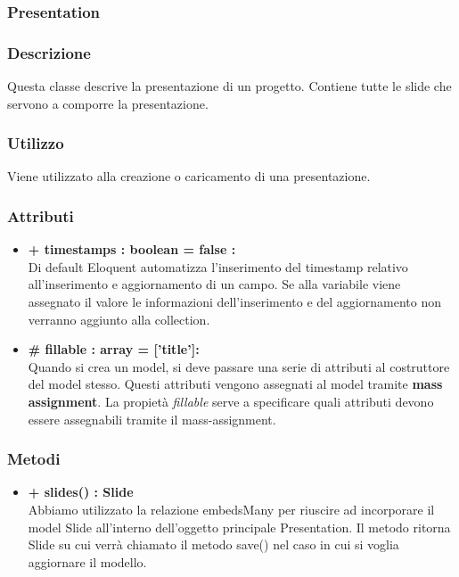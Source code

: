 \newpage
\subsubsection{Presentation}


	\subsubsection*{Descrizione}
	Questa classe descrive la presentazione di un progetto. Contiene tutte le slide che servono a comporre la presentazione.

	\subsubsection*{Utilizzo}
	Viene utilizzato alla creazione o caricamento di una presentazione.
	
	\subsubsection*{Attributi}
	\begin{itemize}
		\item \textbf{+ timestamps : boolean = false :}\\
		Di default Eloquent automatizza l'inserimento del timestamp relativo all'inserimento e aggiornamento di un campo. Se alla variabile viene assegnato il valore le informazioni dell'inserimento e del aggiornamento non verranno aggiunto alla collection.
		\item \textbf{\# fillable : array = ['title']:}\\
		Quando si crea un model, si deve passare una serie di attributi al costruttore del model stesso. Questi attributi vengono assegnati al model tramite \textbf{mass assignment}. La propietà \textit{fillable} serve a specificare quali attributi devono essere assegnabili tramite il mass-assignment.
	\end{itemize}

	\subsubsection*{Metodi}
	\begin{itemize}
		\item \textbf{+ slides() : Slide}\\
		Abbiamo utilizzato la relazione embedsMany per riuscire ad incorporare il model Slide all’interno dell’oggetto principale Presentation. Il metodo ritorna Slide su cui verrà chiamato il metodo save() nel caso in cui si voglia aggiornare il modello.
	\end{itemize}
\newpage

